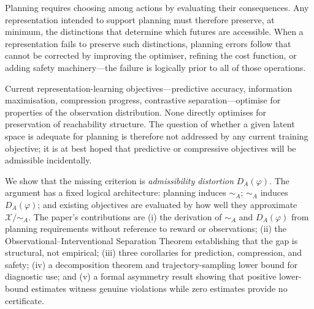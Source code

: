 \documentclass[10pt,twocolumn]{article}
\theoremstyle{plain}
\theoremstyle{definition}
\theoremstyle{remark}
\newcommand{\simA}{\sim_{\!A}}
\newcommand{\DA}{D_{A}(\varphi)}
\begin{document}
Planning requires choosing among actions by evaluating their consequences.
Any representation intended to support planning must therefore preserve, at
minimum, the distinctions that determine which futures are accessible. When a
representation fails to preserve such distinctions, planning errors follow that
cannot be corrected by improving the optimiser, refining the cost function, or
adding safety machinery---the failure is logically prior to all of those
operations.

Current representation-learning objectives---predictive accuracy, information
maximisation, compression progress, contrastive separation---optimise for
properties of the observation distribution. None directly optimises for
preservation of reachability structure. The question of whether a given latent
space is adequate for planning is therefore not addressed by any current training
objective; it is at best hoped that predictive or compressive objectives will be
admissible incidentally.

We show that the missing criterion is \emph{admissibility distortion} $\DA$. The
argument has a fixed logical architecture: planning induces $\simA$; $\simA$
induces $\DA$; and existing objectives are evaluated by how well they approximate
$\mathcal{X}/\simA$. The paper's contributions are (i) the derivation of $\simA$
and $\DA$ from planning requirements without reference to reward or observations;
(ii) the Observational--Interventional Separation Theorem establishing that the gap
is structural, not empirical; (iii) three corollaries for prediction, compression,
and safety; (iv) a decomposition theorem and trajectory-sampling lower bound for
diagnostic use; and (v) a formal asymmetry result showing that positive lower-bound
estimates witness genuine violations while zero estimates provide no certificate.
\end{document}

